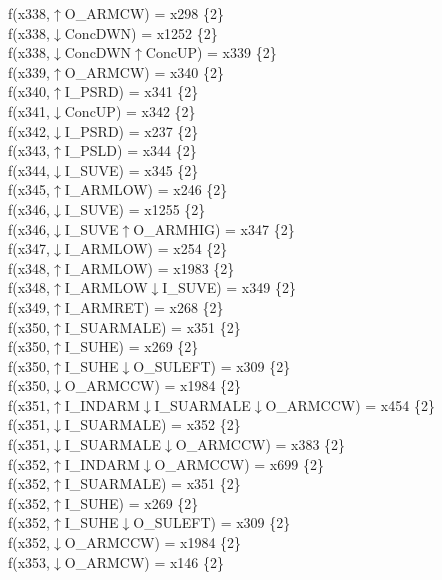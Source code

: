 f(x338,$\uparrow$O\_ARMCW) = x298 \{2\} \\  
f(x338,$\downarrow$ConcDWN) = x1252 \{2\} \\  
f(x338,$\downarrow$ConcDWN$\uparrow$ConcUP) = x339 \{2\} \\  
f(x339,$\uparrow$O\_ARMCW) = x340 \{2\} \\  
f(x340,$\uparrow$I\_PSRD) = x341 \{2\} \\  
f(x341,$\downarrow$ConcUP) = x342 \{2\} \\  
f(x342,$\downarrow$I\_PSRD) = x237 \{2\} \\  
f(x343,$\uparrow$I\_PSLD) = x344 \{2\} \\  
f(x344,$\downarrow$I\_SUVE) = x345 \{2\} \\  
f(x345,$\uparrow$I\_ARMLOW) = x246 \{2\} \\  
f(x346,$\downarrow$I\_SUVE) = x1255 \{2\} \\  
f(x346,$\downarrow$I\_SUVE$\uparrow$O\_ARMHIG) = x347 \{2\} \\  
f(x347,$\downarrow$I\_ARMLOW) = x254 \{2\} \\  
f(x348,$\uparrow$I\_ARMLOW) = x1983 \{2\} \\  
f(x348,$\uparrow$I\_ARMLOW$\downarrow$I\_SUVE) = x349 \{2\} \\  
f(x349,$\uparrow$I\_ARMRET) = x268 \{2\} \\  
f(x350,$\uparrow$I\_SUARMALE) = x351 \{2\} \\  
f(x350,$\uparrow$I\_SUHE) = x269 \{2\} \\  
f(x350,$\uparrow$I\_SUHE$\downarrow$O\_SULEFT) = x309 \{2\} \\  
f(x350,$\downarrow$O\_ARMCCW) = x1984 \{2\} \\  
f(x351,$\uparrow$I\_INDARM$\downarrow$I\_SUARMALE$\downarrow$O\_ARMCCW) = x454 \{2\} \\  
f(x351,$\downarrow$I\_SUARMALE) = x352 \{2\} \\  
f(x351,$\downarrow$I\_SUARMALE$\downarrow$O\_ARMCCW) = x383 \{2\} \\  
f(x352,$\uparrow$I\_INDARM$\downarrow$O\_ARMCCW) = x699 \{2\} \\  
f(x352,$\uparrow$I\_SUARMALE) = x351 \{2\} \\  
f(x352,$\uparrow$I\_SUHE) = x269 \{2\} \\  
f(x352,$\uparrow$I\_SUHE$\downarrow$O\_SULEFT) = x309 \{2\} \\  
f(x352,$\downarrow$O\_ARMCCW) = x1984 \{2\} \\  
f(x353,$\downarrow$O\_ARMCW) = x146 \{2\} \\  
